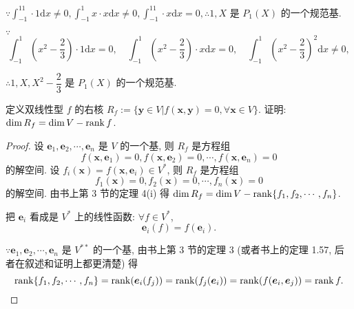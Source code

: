 \documentclass[color=black,device=normal,lang=cn,mode=geye]{elegantnote}
\begin{document}
\begin{solution}
    $\because\int_{-1}^11\cdot 1\mathrm{d}x\neq0,\int_{-1}^1x\cdot x\mathrm{d}x\neq0,\int_{-1}^11\cdot x\mathrm{d}x=0,\therefore1,X$ 是 $P_1(X)$ 的一个规范基.

    $\because$
    \[\int_{-1}^1\left(x^2-\dfrac{2}{3}\right)\cdot 1\mathrm{d}x=0,\quad\int_{-1}^1\left(x^2-\dfrac{2}{3}\right)\cdot x\mathrm{d}x=0,\quad\int_{-1}^1\left(x^2-\dfrac{2}{3}\right)^2\mathrm{d}x\neq0,\]

    $\therefore1,X,X^2-\dfrac{2}{3}$ 是 $P_1(X)$ 的一个规范基.
\end{solution}
\begin{exercisec}[1.72(1)]
    定义双线性型 $f$ 的右核 $R_f:=\{\boldsymbol{y}\in V|f(\boldsymbol{x},\boldsymbol{y})=0,\forall\boldsymbol{x}\in V\}$. 证明: $\dim R_f=\dim V-\operatorname{rank} f$.
\end{exercisec}
\begin{proof}
    设 $\boldsymbol{e}_1,\boldsymbol{e}_2,\cdots,\boldsymbol{e}_n$ 是 $V$ 的一个基, 则 $R_f$ 是方程组
    \[f(\boldsymbol{x},\boldsymbol{e}_1)=0,f(\boldsymbol{x},\boldsymbol{e}_2)=0,\cdots,f(\boldsymbol{x},\boldsymbol{e}_n)=0\]
    的解空间. 设 $f_i(\boldsymbol{x})=f(\boldsymbol{x},\boldsymbol{e}_i)\in V^*$, 则 $R_f$ 是方程组
    \[f_1(\boldsymbol{x})=0,f_2(\boldsymbol{x})=0,\cdots,f_n(\boldsymbol{x})=0\]
    的解空间. 由书上第 3 节的定理 4(i) 得 $\dim R_f=\dim V-\operatorname{rank}\{f_1,f_2,\cdots,f_n\}$.

    把 $\boldsymbol{e}_i$ 看成是 $V^*$ 上的线性函数: $\forall f\in V^*$,
    \[\boldsymbol{e}_i(f)=f(\boldsymbol{e}_i).\]

    $\because\boldsymbol{e}_1,\boldsymbol{e}_2,\cdots,\boldsymbol{e}_n$ 是 $V^{**}$ 的一个基, 由书上第 3 节的定理 3 (或者书上的定理 1.57, 后者在叙述和证明上都更清楚) 得
    \[\operatorname{rank}\{f_1,f_2,\cdots,f_n\}=\operatorname{rank}(\boldsymbol{e}_i(f_j))=\operatorname{rank}(f_j(\boldsymbol{e}_i))=\operatorname{rank}(f(\boldsymbol{e}_i,\boldsymbol{e}_j))=\operatorname{rank} f.\qedhere\]
\end{proof}
\end{document}
